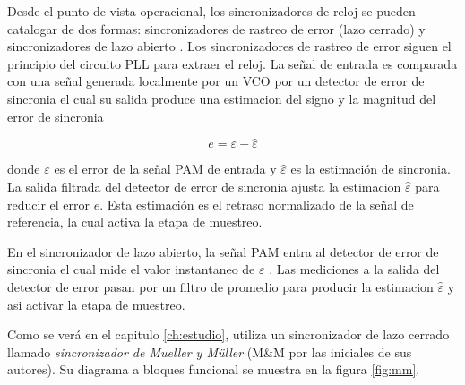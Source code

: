Desde el punto de vista operacional, los sincronizadores de reloj se pueden catalogar de dos formas: sincronizadores de rastreo de
error (lazo cerrado) y sincronizadores de lazo abierto \cite{meyr}. Los sincronizadores de rastreo de error siguen el principio
del circuito PLL para extraer el reloj. La se\~nal de entrada es comparada con una se\~nal generada localmente por un VCO por un detector de
error de sincronia el cual su salida produce una estimacion del signo y la magnitud del error de sincronia

\begin{equation}
e = \varepsilon - \hat{\varepsilon}
\end{equation}

donde $\varepsilon$ es el error de la se\~nal PAM de entrada y $\hat{\varepsilon}$ es la estimaci\'on de sincronia. La salida
filtrada del detector de error de sincronia ajusta la estimacion $\hat{\varepsilon}$ para reducir el error $e$. Esta estimaci\'on
es el retraso normalizado de la se\~nal de referencia, la cual activa la etapa de muestreo.

En el sincronizador de lazo abierto, la se\~nal PAM entra al detector de error de sincronia el cual mide el valor instantaneo de
$\varepsilon$ \cite{meyr}. Las mediciones a la salida del detector de error pasan por un filtro de promedio para producir la
estimacion $\hat{\varepsilon}$ y asi activar la etapa de muestreo.

Como se ver\'a en el capitulo \ref{ch:estudio}, \gnuradio utiliza un sincronizador de lazo cerrado llamado \emph{sincronizador de
Mueller y M\"uller} (M\&M por las iniciales de sus autores). Su diagrama a bloques funcional se muestra en la figura \ref{fig:mm}.

